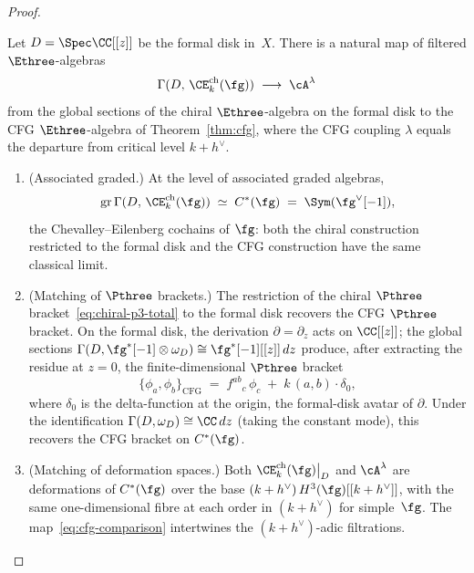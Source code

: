 \begin{proof}
\begin{theorem}
\label{thm:chiral-e3-cfg}
Let $D = \Spec \CC[[z]]$ be the formal disk in~$X$.
There is a natural map of filtered $\Ethree$-algebras
\begin{equation}\label{eq:cfg-comparison}
  \Gamma(D,\, \CE^{\mathrm{ch}}_k(\fg))
  \;\longrightarrow\;
  \cA^\lambda
\end{equation}
from the global sections of the chiral $\Ethree$-algebra
on the formal disk to the CFG $\Ethree$-algebra of
Theorem~\textup{\ref{thm:cfg}}, where the CFG coupling
$\lambda$ equals the departure from critical level
$k + h^\vee$.
\begin{enumerate}[label=\textup{(\roman*)}]
\item \textup{(Associated graded.)}
  At the level of associated graded algebras,
  \begin{equation}\label{eq:cfg-assoc-graded}
    \mathrm{gr}\,\Gamma(D,\, \CE^{\mathrm{ch}}_k(\fg))
    \;\simeq\;
    C^*(\fg)
    \;=\;
    \Sym(\fg^\vee[-1]),
  \end{equation}
  the Chevalley--Eilenberg cochains of $\fg$: both the
  chiral construction restricted to the formal disk and the
  CFG construction have the same classical limit.
\item \textup{(Matching of $\Pthree$ brackets.)}
  The restriction of the chiral $\Pthree$
  bracket~\eqref{eq:chiral-p3-total} to the formal disk
  recovers the CFG $\Pthree$ bracket.
  On the formal disk, the derivation $\partial = \partial_z$
  acts on $\CC[[z]]$; the global sections
  $\Gamma(D, \fg^*[-1] \otimes \omega_D)
  \cong \fg^*[-1][[z]]\,dz$ produce, after extracting the
  residue at $z = 0$, the finite-dimensional $\Pthree$
  bracket
  \[
    \{\phi_a, \phi_b\}_{\mathrm{CFG}}
    \;=\;
    f^{ab}{}_c\,\phi_c
    \;+\;
    k\,(a,b) \cdot \delta_0,
  \]
  where $\delta_0$ is the delta-function at the origin,
  the formal-disk avatar of $\partial$. Under the
  identification $\Gamma(D, \omega_D) \cong \CC\,dz$
  \textup{(}taking the constant mode\textup{)}, this
  recovers the CFG bracket on $C^*(\fg)$.
\item \textup{(Matching of deformation spaces.)}
  Both $\CE^{\mathrm{ch}}_k(\fg)\big|_D$ and
  $\cA^\lambda$ are deformations of $C^*(\fg)$ over the
  base $(k+h^\vee)\,H^3(\fg)[[k+h^\vee]]$, with the same
  one-dimensional fibre at each order in $(k+h^\vee)$ for
  simple~$\fg$.
  The map~\eqref{eq:cfg-comparison} intertwines
  the $(k+h^\vee)$-adic filtrations.
\end{enumerate}
\end{theorem}


\end{proof}
